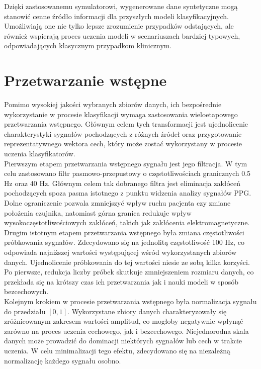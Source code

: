 \documentclass[a4paper,twoside,12pt]{book}
\begin{document}
Dzięki zastosowanemu symulatorowi, wygenerowane dane syntetyczne mogą stanowić cenne źródło informacji dla przyszłych modeli klasyfikacyjnych. Umożliwiają one nie tylko lepsze zrozumienie przypadków odstających, ale również wspierają proces uczenia modeli w scenariuszach bardziej typowych, odpowiadających klasycznym przypadkom klinicznym.

\section{Przetwarzanie wstępne}
Pomimo wysokiej jakości wybranych zbiorów danych, ich bezpośrednie wykorzystanie w procesie klasyfikacji wymaga zastosowania wieloetapowego przetwarzania wstępnego. Głównym celem tych transformacji jest ujednolicenie charakterystyki sygnałów pochodzących z różnych źródeł oraz przygotowanie reprezentatywnego wektora cech, który może zostać wykorzystany w procesie uczenia klasyfikatorów.\\

\newpage
Pierwszym etapem przetwarzania wstępnego sygnału jest jego filtracja. W tym celu zastosowano filtr pasmowo-przepustowy o częstotliwościach granicznych 0.5 Hz oraz 40 Hz. Głównym celem tak dobranego filtra jest eliminacja zakłóceń pochodzących spoza pasma istotnego z punktu widzenia analizy sygnałów PPG. Dolne ograniczenie pozwala zmniejszyć wpływ ruchu pacjenta czy zmiane położenia czujnika, natomiast górna granica redukuje wpływ wysokoczęstotliwościowych zakłóceń, takich jak zakłócenia elektromagnetyczne.\\

Drugim istotnym etapem przetwarzania wstępnego była zmiana częstotliwości próbkowania sygnałów. Zdecydowano się na jednolitą częstotliwość 100 Hz, co odpowiada najniższej wartości występującej wśród wykorzystanych zbiorów danych. Ujednolicenie próbkowania do tej wartości niesie ze sobą kilka korzyści. Po pierwsze, redukcja liczby próbek skutkuje zmniejszeniem rozmiaru danych, co przekłada się na krótszy czas ich przetwarzania jak i nauki modeli w sposób bezcechowych.\\

Kolejnym krokiem w procesie przetwarzania wstępnego była normalizacja sygnału do przedziału $[0, 1]$. Wykorzystane zbiory danych charakteryzowały się zróżnicowanym zakresem wartości amplitud, co mogłoby negatywnie wpłynąć zarówno na proces uczenia cechowego, jak i bezcechowego. Niejednorodna skala danych może prowadzić do dominacji niektórych sygnałów lub cech w trakcie uczenia. W celu minimalizacji tego efektu, zdecydowano się na niezależną normalizację każdego sygnału osobno.\\
\end{document}
